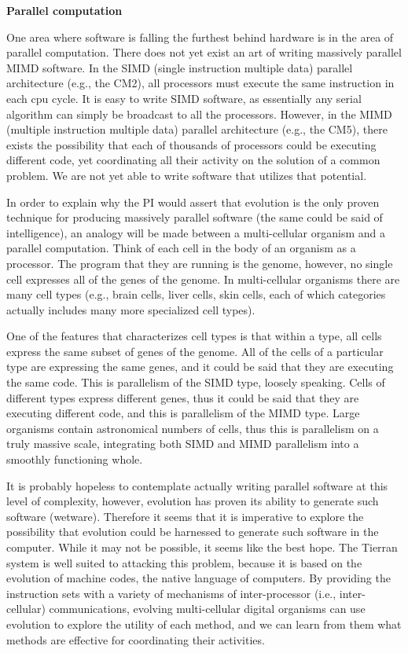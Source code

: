 \LP
{\bf Parallel computation}
\eLP

One area where software is falling the furthest behind hardware is in the
area of parallel computation.  There does not yet exist an art of writing
massively parallel MIMD software.  In the SIMD (single instruction multiple
data) parallel architecture (e.g., the CM2), all processors must execute the
same instruction in each cpu cycle.  It is easy to write SIMD software, as
essentially any serial algorithm can simply be broadcast to all the
processors.  However, in the MIMD (multiple instruction multiple data)
parallel architecture (e.g., the CM5), there exists the possibility that each
of thousands of processors could be executing different code, yet coordinating
all their activity on the solution of a common problem.  We are not
yet able to write software that utilizes that potential.

In order to explain why the PI would assert that evolution is the only proven
technique for producing massively parallel software (the same could be said
of intelligence), an analogy will be made between a multi-cellular organism
and a parallel computation.  Think of each cell in the body of an organism
as a processor.  The program that they are running is the genome, however,
no single cell expresses all of the genes of the genome.  In multi-cellular
organisms there are many cell types (e.g., brain cells, liver cells, skin
cells, each of which categories actually includes many more specialized cell
types).

One of the features that characterizes cell types is that within a type, all
cells express the same subset of genes of the genome.  All of the cells of a
particular type are expressing the same genes, and it could be said that they
are executing the same code.  This is parallelism of the SIMD type, loosely
speaking.  Cells of different types express different genes, thus it could be
said that they are executing different code, and this is parallelism of the
MIMD type.  Large organisms contain astronomical numbers of cells, thus this
is parallelism on a truly massive scale, integrating both SIMD and MIMD
parallelism into a smoothly functioning whole.

It is probably hopeless to contemplate actually writing parallel software at
this level of complexity, however, evolution has proven its ability to
generate such software (wetware).  Therefore it seems that it is imperative to
explore the possibility that evolution could be harnessed to generate such
software in the computer.  While it may not be possible, it seems like the
best hope.  The Tierran system is well suited to attacking this problem,
because it is based on the evolution of machine codes, the native language of
computers.  By providing the instruction sets with a variety of mechanisms of
inter-processor (i.e., inter-cellular) communications, evolving multi-cellular
digital organisms can use evolution to explore the utility of each method,
and we can learn from them what methods are effective for coordinating their
activities.

